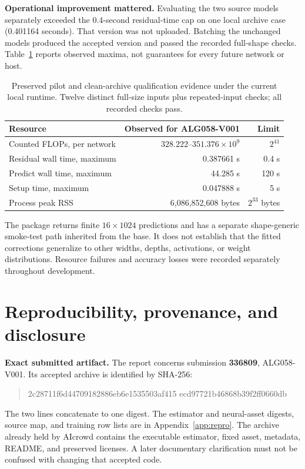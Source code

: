 \documentclass[10pt]{article}
\newcommand{\sectionpage}[1]{\clearpage\section{#1}}
\begin{document}
\textbf{Operational improvement mattered.} Evaluating the two source models
separately exceeded the 0.4-second residual-time cap on one local archive
case (0.401164 seconds). That version was not uploaded. Batching the unchanged
models produced the accepted version and passed the recorded full-shape
checks. Table~\ref{tab:resources} reports observed maxima, not guarantees for
every future network or host.

\begin{table}[h]\centering\small
\begin{tabular}{@{}lrr@{}}\toprule
Resource & Observed for ALG058-V001 & Limit\\\midrule
Counted FLOPs, per network & \(328.222\)--\(351.376\times10^9\) & \(2^{41}\)\\
Residual wall time, maximum & 0.387661 s & 0.4 s\\
Predict wall time, maximum & 44.285 s & 120 s\\
Setup time, maximum & 0.047888 s & 5 s\\
Process peak RSS & 6,086,852,608 bytes & \(2^{33}\) bytes\\\bottomrule
\end{tabular}
\caption{Preserved pilot and clean-archive qualification evidence under the
current local runtime. Twelve distinct full-size inputs plus repeated-input
checks; all recorded checks pass.}\label{tab:resources}
\end{table}

The package returns finite \(16\times1024\) predictions and has a separate
shape-generic smoke-test path inherited from the base. It does not establish
that the fitted corrections generalize to other widths, depths, activations,
or weight distributions. Resource failures and accuracy losses were recorded
separately throughout development.

\sectionpage{Reproducibility, provenance, and disclosure}
\textbf{Exact submitted artifact.} The report concerns submission
\textbf{336809}, ALG058-V001. Its accepted archive is identified by SHA-256:
\begin{quote}\small\ttfamily
2c28711f6d44709182886eb6e1535503af415\newline
ecd97721b46868b39f2ff0660db
\end{quote}
The two lines concatenate to one digest. The estimator and neural-asset
digests, source map, and training row lists are in Appendix~\ref{app:repro}.
The archive already held by AIcrowd contains the executable estimator,
fixed asset, metadata, README, and preserved licenses. A later documentary
clarification must not be confused with changing that accepted code.
\end{document}
